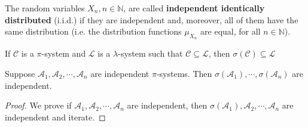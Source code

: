\documentclass[11pt,singlecolumn, openany, citestyle=authoryear]{elegantbook}
\begin{document}
\begin{CJK}{UTF8}{gbsn}

\begin{definition}
    The random variables $X_n, n \in \mathbb{N}$, are called \textbf{independent
    identically distributed} 
    (i.i.d.) if they are independent and, moreover, all of them have the same
    distribution (i.e. the distribution functions $\mu_{X_n}$ are equal, for all $n \in \mathbb{N}$).
\end{definition}

\begin{theorem}
    If $\mathcal{C}$ is a $\pi$-system and $\mathcal{L}$ is a $\lambda$-system such that 
    $\mathcal{C}\subseteq \mathcal{L}$, then 
    $\sigma(\mathcal{C})\subseteq \mathcal{L}$
\end{theorem}

\begin{theorem}\label{thm:thm1}
    Suppose $\mathcal{A}_1,\mathcal{A}_2,\cdots,\mathcal{A}_n$ are independent 
    $\pi$-systems. Then $\sigma(\mathcal{A}_1),\cdots,\sigma(\mathcal{A}_n)$ are 
    independent.
\end{theorem}
\begin{proof}
    We prove if $\mathcal{A}_1,\mathcal{A}_2,\cdots,\mathcal{A}_n$ are independent, 
    then $\sigma(\mathcal{A}_1),\mathcal{A}_2,\cdots,\mathcal{A}_n$ are independent and 
    iterate.


\end{proof}
\end{CJK}
\end{document}
